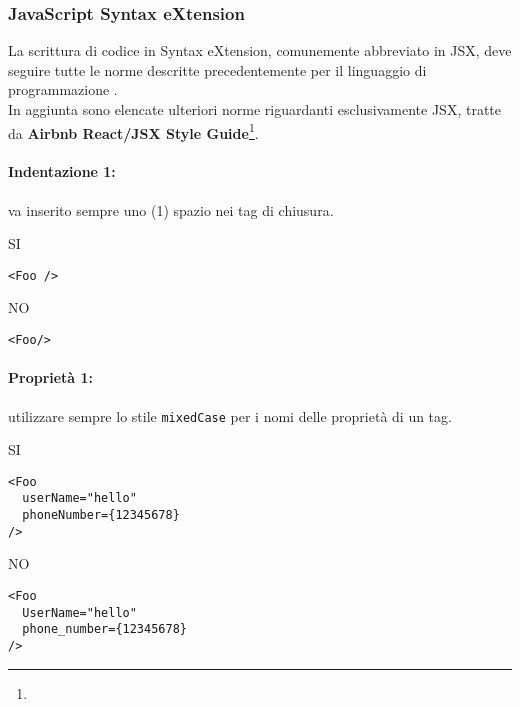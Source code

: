 \documentclass[../ProcessiPrimari.tex]{subfiles}
\begin{document}
	
	\subsubsection{JavaScript Syntax eXtension}
	La scrittura di codice in  Syntax eXtension, comunemente abbreviato in JSX, deve seguire tutte le norme descritte precedentemente per il linguaggio di programmazione .\\
	In aggiunta sono elencate ulteriori norme riguardanti esclusivamente JSX, tratte da \textbf{Airbnb React/JSX Style Guide}\footnote{}. 

	\paragraph*{Indentazione 1: }
	va inserito sempre uno (1) spazio nei tag di chiusura.	
	\begin{center}{	
			\begin{minipage}{3cm}
				{\begin{center}SI\end{center}}
				\begin{Verbatim}[frame=single]
<Foo />
				\end{Verbatim}
			\end{minipage}
			\hfil
			\begin{minipage}{3cm}
				{\begin{center}NO\end{center}}
				\begin{Verbatim}[frame=single]
<Foo/>
				\end{Verbatim}
			\end{minipage}
		}
	\end{center}	
	\paragraph*{Proprietà 1: }
utilizzare sempre lo stile \texttt{mixedCase} per i nomi delle proprietà di un tag. 
	\begin{center}{
			\begin{minipage}{6cm}
				{\begin{center}SI\end{center}}
				\begin{Verbatim}[frame=single]
<Foo
  userName="hello"
  phoneNumber={12345678}
/>
				\end{Verbatim}
			\end{minipage}
			\hfil
			\begin{minipage}{6cm}
				{\begin{center}NO\end{center}}
				\begin{Verbatim}[frame=single]
<Foo
  UserName="hello"
  phone_number={12345678}
/>
				\end{Verbatim}
			\end{minipage}
		}
	\end{center}
\end{document}
